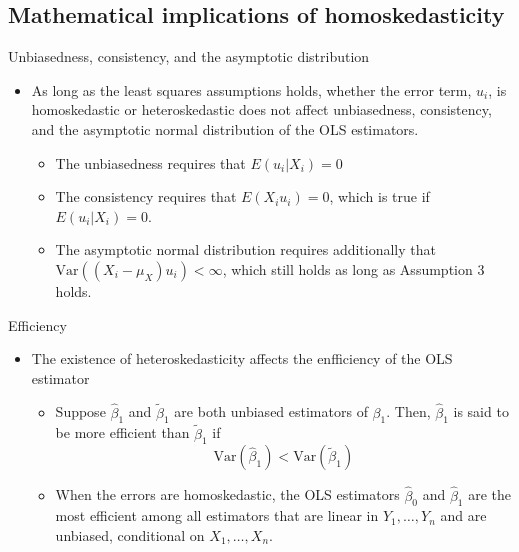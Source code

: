 \documentclass[presentation]{beamer}
\begin{document}
\subsection*{Mathematical implications of homoskedasticity}
\label{sec:orgdaaaefe}

\begin{frame}[label={sec:org58612a6}]{Unbiasedness, consistency, and the asymptotic distribution}
\begin{itemize}
\item As long as the least squares assumptions holds, whether the error
term, \(u_i\), is homoskedastic or heteroskedastic does not affect
unbiasedness, consistency, and the asymptotic normal distribution
of the OLS estimators.
\begin{itemize}
\item The unbiasedness requires that \(E(u_i|X_i) = 0\)
\item The consistency requires that \(E(X_i u_i) = 0\), which is true if
\(E(u_i|X_i)=0\).
\item The asymptotic normal distribution requires additionally that
\(\mathrm{Var}((X_i-\mu_X)u_i) < \infty\), which still holds as long as
Assumption 3 holds.
\end{itemize}
\end{itemize}
\end{frame}

\begin{frame}[label={sec:orgc20e26e}]{Efficiency}
\begin{itemize}
\item The existence of heteroskedasticity affects the enfficiency of the
OLS estimator

\begin{itemize}
\item Suppose \(\hat{\beta}_1\) and \(\tilde{\beta}_1\) are both unbiased
estimators of \(\beta_1\). Then, \(\hat{\beta}_1\) is said to be more
\alert{efficient} than \(\tilde{\beta}_1\) if 
$$\mathrm{Var}(\hat{\beta}_1) < \mathrm{Var}(\tilde{\beta}_1)$$

\item When the errors are homoskedastic, the OLS estimators
\(\hat{\beta}_0\) and \(\hat{\beta}_1\) are the most efficient among
all estimators that are linear in \(Y_1, \ldots, Y_n\) and are
unbiased, conditional on \(X_1, \ldots, X_n\).
\end{itemize}
\end{itemize}
\end{frame}
\end{document}
